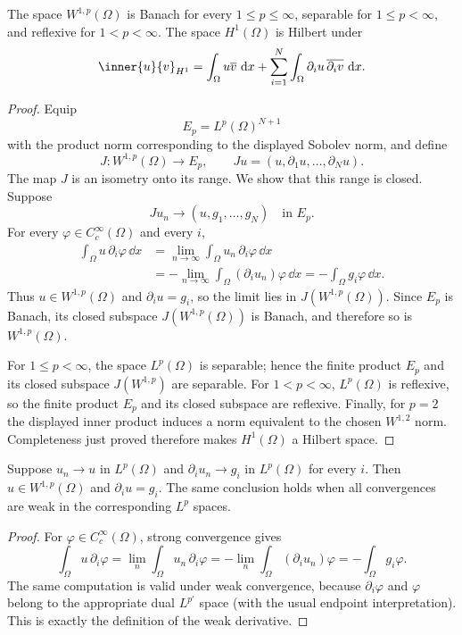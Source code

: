 \begin{noteproposition}
The space $W^{1,p}(\Omega)$ is Banach for every $1\le p\le\infty$, separable
for $1\le p<\infty$, and reflexive for $1<p<\infty$.  The space
$H^1(\Omega)$ is Hilbert under
\[
  \inner{u}{v}_{H^1}
  =\int_\Omega u\overline v\,\dd x
   +\sum_{i=1}^N\int_\Omega
      \partial_i u\,\overline{\partial_i v}\,\dd x.
\]
\end{noteproposition}

\begin{proof}
Equip
\[
  E_p=L^p(\Omega)^{N+1}
\]
with the product norm corresponding to the displayed Sobolev norm, and define
\[
  J\colon W^{1,p}(\Omega)\longrightarrow E_p,
  \qquad
  Ju=(u,\partial_1u,\ldots,\partial_Nu).
\]
The map $J$ is an isometry onto its range.  We show that this range is closed.
Suppose
\[
  Ju_n\longrightarrow(u,g_1,\ldots,g_N)
  \quad\text{in }E_p.
\]
For every $\varphi\in C_c^\infty(\Omega)$ and every $i$,
\[
\begin{aligned}
  \int_\Omega u\,\partial_i\varphi\,\dd x
  &=\lim_{n\to\infty}
      \int_\Omega u_n\,\partial_i\varphi\,\dd x \\
  &=-\lim_{n\to\infty}
      \int_\Omega(\partial_i u_n)\varphi\,\dd x
   =-\int_\Omega g_i\varphi\,\dd x.
\end{aligned}
\]
Thus $u\in W^{1,p}(\Omega)$ and $\partial_i u=g_i$, so the limit lies in
$J(W^{1,p}(\Omega))$.  Since $E_p$ is Banach, its closed subspace
$J(W^{1,p}(\Omega))$ is Banach, and therefore so is $W^{1,p}(\Omega)$.

For $1\le p<\infty$, the space $L^p(\Omega)$ is separable; hence the finite
product $E_p$ and its closed subspace $J(W^{1,p})$ are separable.  For
$1<p<\infty$, $L^p(\Omega)$ is reflexive, so the finite product $E_p$ and its
closed subspace are reflexive.  Finally, for $p=2$ the displayed inner product
induces a norm equivalent to the chosen $W^{1,2}$ norm.  Completeness just
proved therefore makes $H^1(\Omega)$ a Hilbert space.
\end{proof}

\begin{noteproposition}
Suppose $u_n\to u$ in $L^p(\Omega)$ and
$\partial_i u_n\to g_i$ in $L^p(\Omega)$ for every $i$.  Then
$u\in W^{1,p}(\Omega)$ and $\partial_i u=g_i$.  The same conclusion holds
when all convergences are weak in the corresponding $L^p$ spaces.
\end{noteproposition}

\begin{proof}
For $\varphi\in C_c^\infty(\Omega)$, strong convergence gives
\[
  \int_\Omega u\,\partial_i\varphi
  =\lim_n\int_\Omega u_n\,\partial_i\varphi
  =-\lim_n\int_\Omega(\partial_i u_n)\varphi
  =-\int_\Omega g_i\varphi.
\]
The same computation is valid under weak convergence, because
$\partial_i\varphi$ and $\varphi$ belong to the appropriate dual $L^{p'}$
space (with the usual endpoint interpretation).  This is exactly the
definition of the weak derivative.
\end{proof}


